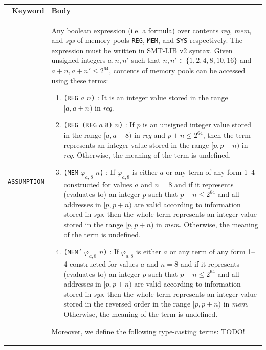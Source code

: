 \documentclass[10pt,twocolumn]{article}
\begin{document}
\begin{table}[!ht]
\begin{center}
\def\arraystretch{1.5}
\begin{tabular}{rp{12.5cm}}
\textbf{Keyword} & \textbf{Body}
\\

\texttt{ASSUMPTION} %
& Any boolean expression (i.e. a formula) over contents \textit{reg},
\textit{mem}, and \textit{sys} of memory pools \texttt{REG}, \texttt{MEM}, and
\texttt{SYS} respectively. The expression must be written in SMT-LIB v2 syntax.
Given unsigned integers $ a, n, n' $ such that $ n,n' \in \{1,2,4,8,10,16\} $
and $ a+n,a+n' \leq 2^{64} $, contents of memory pools can be accessed using
these terms:
\begin{enumerate}
\item  \texttt{(REG} $ a $ $ n $\texttt{)} : It is an integer value stored in
the range $ [a,a+n) $ in \textit{reg}. %

\item  \texttt{(REG (REG} $ a $ \texttt{8)} $ n $\texttt{)} : If $ p $ is an
unsigned integer value stored in the range $ [a,a+8) $ in \textit{reg} and $ p+n
\leq 2^{64}  $, then the term represents an integer value stored in the range $
[p,p+n) $ in \textit{reg}. Otherwise, the meaning of the term is undefined. %

\item  \texttt{(MEM} $ \varphi_{a,8} $ $ n $\texttt{)} : If $ \varphi_{a,8} $ is
either $ a $ or any term of any form 1--4 constructed for values $ a $ and $ n =
8 $ and if it represents (evaluates to) an integer $ p $ such that $ p+n \leq
2^{64}  $ and all addresses in $ [p,p+n) $ are valid according to information
stored in \textit{sys}, then the whole term represents an integer value stored
in the range $ [p,p+n) $ in \textit{mem}. Otherwise, the meaning of the term is
undefined. %

\item  \texttt{(MEM'} $ \varphi_{a,8} $ $ n $\texttt{)} : If $ \varphi_{a,8} $
is either $ a $ or any term of any form 1--4 constructed for values $ a $ and $
n = 8 $ and if it represents (evaluates to) an integer $ p $ such that $ p+n
\leq 2^{64}  $ and all addresses in $ [p,p+n) $ are valid according to
information stored in \textit{sys}, then the whole term represents an integer
value stored in the reversed order in the range $ [p,p+n) $ in \textit{mem}.
Otherwise, the meaning of the term is undefined. %
\end{enumerate}
Moreover, we define the following type-casting terms: TODO!


\end{tabular}
\end{center}
\end{table}
\end{document}

